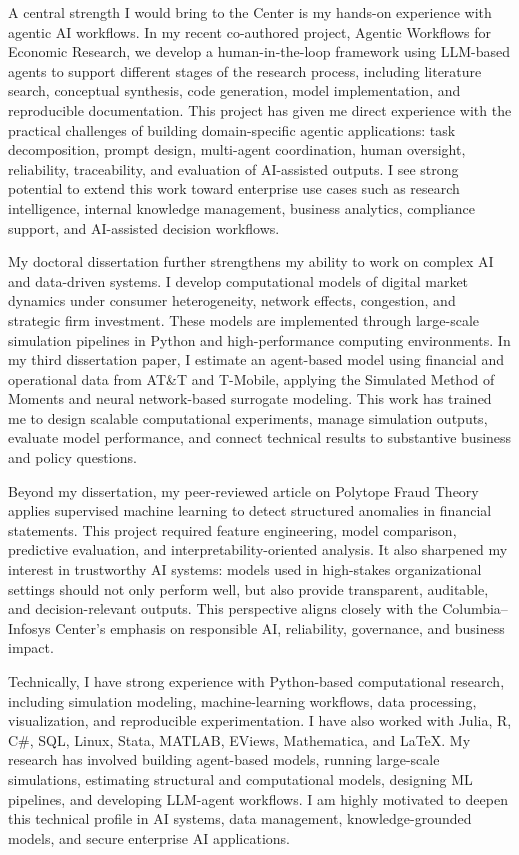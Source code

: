 \documentclass[11pt]{article}
\begin{document}
A central strength I would bring to the Center is my hands-on experience with agentic AI workflows. In my recent co-authored project, Agentic Workflows for Economic Research, we develop a human-in-the-loop framework using LLM-based agents to support different stages of the research process, including literature search, conceptual synthesis, code generation, model implementation, and reproducible documentation. This project has given me direct experience with the practical challenges of building domain-specific agentic applications: task decomposition, prompt design, multi-agent coordination, human oversight, reliability, traceability, and evaluation of AI-assisted outputs. I see strong potential to extend this work toward enterprise use cases such as research intelligence, internal knowledge management, business analytics, compliance support, and AI-assisted decision workflows.

My doctoral dissertation further strengthens my ability to work on complex AI and data-driven systems. I develop computational models of digital market dynamics under consumer heterogeneity, network effects, congestion, and strategic firm investment. These models are implemented through large-scale simulation pipelines in Python and high-performance computing environments. In my third dissertation paper, I estimate an agent-based model using financial and operational data from AT\&T and T-Mobile, applying the Simulated Method of Moments and neural network-based surrogate modeling. This work has trained me to design scalable computational experiments, manage simulation outputs, evaluate model performance, and connect technical results to substantive business and policy questions.

Beyond my dissertation, my peer-reviewed article on Polytope Fraud Theory applies supervised machine learning to detect structured anomalies in financial statements. This project required feature engineering, model comparison, predictive evaluation, and interpretability-oriented analysis. It also sharpened my interest in trustworthy AI systems: models used in high-stakes organizational settings should not only perform well, but also provide transparent, auditable, and decision-relevant outputs. This perspective aligns closely with the Columbia--Infosys Center's emphasis on responsible AI, reliability, governance, and business impact.

Technically, I have strong experience with Python-based computational research, including simulation modeling, machine-learning workflows, data processing, visualization, and reproducible experimentation. I have also worked with Julia, R, C\#, SQL, Linux, Stata, MATLAB, EViews, Mathematica, and \LaTeX. My research has involved building agent-based models, running large-scale simulations, estimating structural and computational models, designing ML pipelines, and developing LLM-agent workflows. I am highly motivated to deepen this technical profile in AI systems, data management, knowledge-grounded models, and secure enterprise AI applications.
\end{document}
